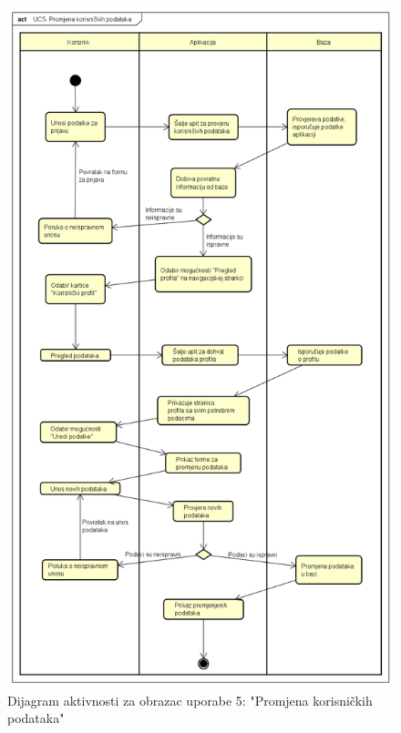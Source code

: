         \begin{figure}[H]
		      \includegraphics[scale=0.45]{./Dijagrami/UC5_Promjena_korisničkih_podataka_activity.png}
		      \centering
		      \caption{Dijagram aktivnosti za obrazac uporabe 5: "Promjena korisničkih podataka"}
		      \label{fig:promjene}
	   \end{figure}

		
	

